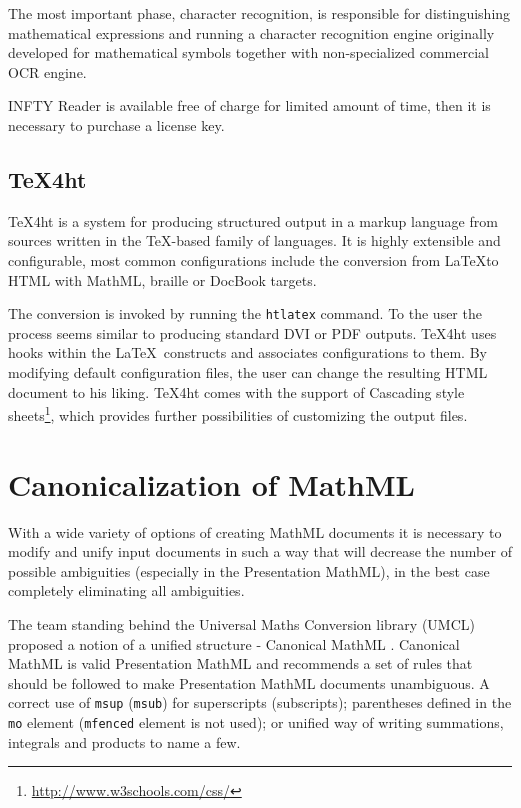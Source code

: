 \documentclass[11pt,oneside,final]{fithesis2}
\begin{document}
The most important phase, character recognition, is responsible for distinguishing mathematical expressions and running a character recognition engine originally developed for mathematical symbols together with non-specialized commercial OCR engine. 

INFTY Reader is available free of charge for limited amount of time, then it is necessary to purchase a license key.

\subsection{\TeX 4ht}
\TeX 4ht \cite{tex4ht:gurari2004} is a system for producing structured output in a markup language from sources written in the \TeX -based family of languages. It is highly extensible and configurable, most common configurations include the conversion from \LaTeX to HTML with MathML, braille or DocBook targets.

The conversion is invoked by running the \texttt{htlatex} command. To the user the process seems similar to producing standard DVI or PDF outputs. \TeX 4ht uses hooks within the \LaTeX\ constructs and associates configurations to them. By modifying default configuration files, the user can change the resulting HTML document to his liking. \TeX 4ht comes with the support of Cascading style sheets\footnote{\url{http://www.w3schools.com/css/}}, which provides further possibilities of customizing the output files. 

\section{Canonicalization of MathML}
\label{section:canonicalization}
With a wide variety of options of creating MathML documents it is necessary to modify and unify input documents in such a way that will decrease the number of possible ambiguities (especially in the Presentation MathML), in the best case completely eliminating all ambiguities. 

The team standing behind the Universal Maths Conversion library (UMCL) \cite{umcl:archambault2004towards} proposed a notion of a unified structure - Canonical MathML \cite{umcl:archambault2006canonical}. Canonical MathML is valid Presentation MathML and recommends a set of rules that should be followed to make Presentation MathML documents unambiguous. A correct use of \texttt{msup} (\texttt{msub}) for superscripts (subscripts); parentheses defined in the \texttt{mo} element (\texttt{mfenced} element is not used); or unified way of writing summations, integrals and products to name a few. 
\end{document}
